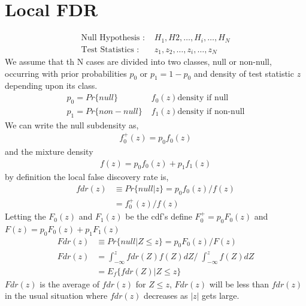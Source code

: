 \documentclass[11pt]{article}
\begin{document}
\section{Local FDR}
\begin{align*}
\text{Null Hypothesis : }& H_1 , H2, \dots , H_i, \dots, H_N \\
\text{Test Statistics : }& z_1, z_2, \dots , z_i , \dots, z_N
\end{align*}
We assume that th N cases are divided into two classes, null or non-null, occurring with prior probabilities $p_0$ or $p_1 = 1- p_0$ and density of test statistic $z$ depending upon its class.
\begin{align*}
p_0 = Pr\{null\}& \; f_0(z) \text{density if null}\\
p_1 = Pr\{non-null\}& \; f_1(z) \text{density if non-null}
\end{align*}
We can write the null subdensity as,
\begin{align*}
f_0^+(z) = p_0 f_0(z)
\end{align*}
and the mixture density
\begin{align*}
f(z) = p_0 f_0(z) + p_1 f_1(z)
\end{align*}
by definition the local false discovery rate is,
\begin{align*}
fdr(z) &\equiv Pr\{null | z\} = p_0 f_0(z) / f(z)\\
&=f_0^+(z)/f(z)
\end{align*}
Letting the $F_0(z)$ and $F_1(z)$ be the cdf's define $F_0^+ = p_0 F_0(z)$ and $F(z) = p_0 F_0(z) + p_1 F_1(z)$
\begin{align*}
Fdr(z) &\equiv Pr\{null |Z \le z\} = p_0 F_0(z) / F(z)\\
Fdr(z) &= \int_{-\infty}^{z} fdr(Z)f(Z)dZ/\; \int_{-\infty}^{z} f(Z)dZ\\
&=E_f \{ fdr(Z)  |Z \le z \}
\end{align*}
$Fdr(z)$ is the average of $fdr(z)$ for $ Z \le z$, $Fdr(z)$ will be less than $fdr(z)$ in the usual situation where $fdr(z)$ decreases as $|z|$ gets large.
\end{document}

